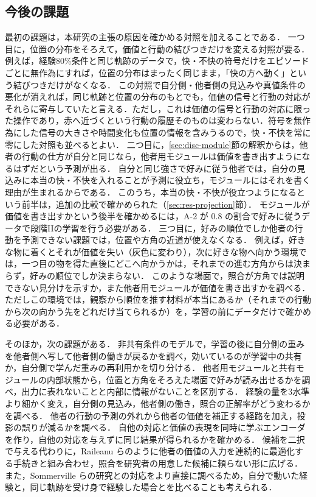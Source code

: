 \subsection{今後の課題}\label{sec:future}
最初の課題は，本研究の主張の原因を確かめる対照を加えることである．
一つ目に，位置の分布をそろえて，価値と行動の結びつきだけを変える対照が要る．
例えば，経験80\%条件と同じ軌跡のデータで，快・不快の符号だけをエピソードごとに無作為にすれば，位置の分布はまったく同じまま，「快の方へ動く」という結びつきだけがなくなる．
この対照で自分側・他者側の見込みや真値条件の悪化が消えれば，同じ軌跡と位置の分布のもとでも，価値の信号と行動の対応がそれらに寄与していたと言える．ただし，これは価値の信号と行動の対応に限った操作であり，赤へ近づくという行動の履歴そのものは変わらない．符号を無作為にした信号の大きさや時間変化も位置の情報を含みうるので，快・不快を常に零にした対照も並べるとよい．
二つ目に，\ref{sec:disc-module}節の解釈からは，他者の行動の仕方が自分と同じなら，他者用モジュールは価値を書き出すようになるはずだという予測が出る．
自分と同じ強さで好みに従う他者では，自分の見込みに本当の快・不快を入れることが予測に役立ち，モジュールにはそれを書く理由が生まれるからである．
このうち，本当の快・不快が役立つようになるという前半は，追加の比較で確かめられた（\ref{sec:res-projection}節）．
モジュールが価値を書き出すかという後半を確かめるには，A-2 が 0.8 の割合で好みに従うデータで段階IIの学習を行う必要がある．
三つ目に，好みの順位でしか他者の行動を予測できない課題では，位置や方角の近道が使えなくなる．
例えば，好きな物に着くとそれが価値を失い（灰色に変わり），次に好きな物へ向かう環境では，一つ目の物を得た直後にどこへ向かうかは，それまでの進む方角からは決まらず，好みの順位でしか決まらない．
このような場面で，照合が方角では説明できない見分けを示すか，また他者用モジュールが価値を書き出すかを調べる．
ただしこの環境では，観察から順位を推す材料が本当にあるか（それまでの行動から次の向かう先をどれだけ当てられるか）を，学習の前にデータだけで確かめる必要がある．

そのほか，次の課題がある．
非共有条件のモデルで，学習の後に自分側の重みを他者側へ写して他者側の働きが戻るかを調べ，効いているのが学習中の共有か，自分側で学んだ重みの再利用かを切り分ける．
他者用モジュールと共有モジュールの内部状態から，位置と方角をそろえた場面で好みが読み出せるかを調べ，出力に表れないことと内部に情報がないことを区別する．
経験の量を3水準より細かく変え，自分側の見込み，他者側の働き，照合の正解率がどう変わるかを調べる．
他者の行動の予測の外れから他者の価値を補正する経路を加え，投影の誤りが減るかを調べる．
自他の対応と価値の表現を同時に学ぶエンコーダを作り，自他の対応を与えずに同じ結果が得られるかを確かめる．
候補を二択で与える代わりに，Raileanu ら\cite{raileanu2018modeling}のように他者の価値の入力を連続的に最適化する手続きと組み合わせ，照合を研究者の用意した候補に頼らない形に広げる．
また，Sommerville らの研究との対応をより直接に調べるため，自分で動いた経験と，同じ軌跡を受け身で経験した場合とを比べることも考えられる．
